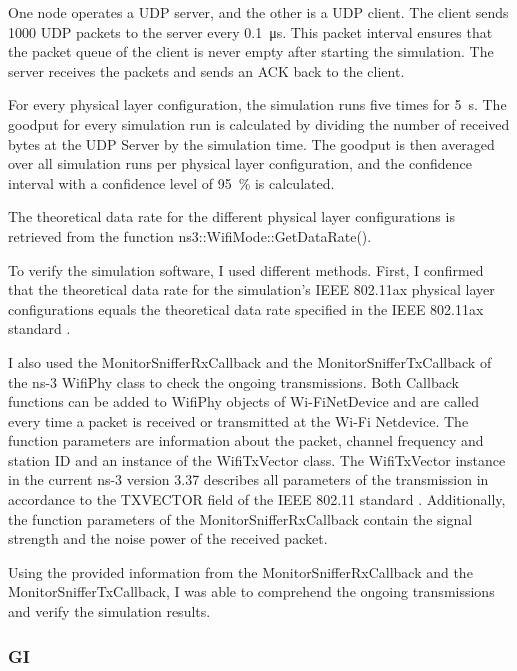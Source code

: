 One node operates a \ac{UDP} server, and the other is a \ac{UDP} client.
The client sends \SI{1000}{\byte} \ac{UDP} packets to the server every \SI{0.1}{\micro\second}.
This packet interval
ensures that the packet queue of the client is never empty after starting the simulation.
The server receives the packets and sends an ACK back to the client.

For every physical layer configuration, the simulation runs five times for \SI{5}{\second}.
The goodput for every simulation run is calculated by dividing the number of received bytes at the \ac{UDP} Server by the simulation time.
The goodput is then averaged over all simulation runs per physical layer configuration, and the confidence interval with a confidence level of
\SI{95}{\percent} is calculated.

The theoretical data rate for the different physical layer configurations is retrieved from the function ns3::WifiMode::GetDataRate().

To verify the simulation software, I used different methods.
First, I confirmed that the theoretical data rate for the simulation's IEEE 802.11ax physical layer configurations equals the theoretical data rate specified in the IEEE 802.11ax standard \cite{ieee_standard_2021ax}.

I also used the MonitorSnifferRxCallback and the MonitorSnifferTxCallback of the ns-3 WifiPhy class to check the ongoing transmissions.
Both Callback functions can be added to WifiPhy objects of Wi-FiNetDevice and are called every time a packet is received or transmitted at the Wi-Fi Netdevice.
The function parameters are information about the packet, channel frequency and station ID and an instance of the WifiTxVector class.
The WifiTxVector instance in the current ns-3 version 3.37 describes all parameters of the transmission in accordance to the TXVECTOR field of the IEEE 802.11 standard \cite{ieee_standard_2021ax}. Additionally, the function parameters of the MonitorSnifferRxCallback contain the signal strength and
the noise power of the received packet.

Using the provided information from the MonitorSnifferRxCallback and the MonitorSnifferTxCallback, I was able to comprehend the ongoing transmissions and
verify the simulation results.

\subsubsection*{\acf{GI}}

